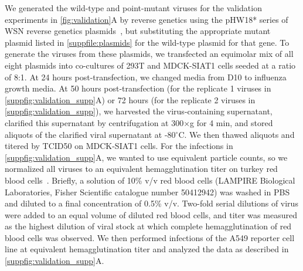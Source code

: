 \documentclass[10pt,letterpaper]{article}
\newcommand{\FIG}[1]{\autoref{fig:#1}}
\newcommand{\SUPPFILE}[1]{\autoref{suppfile:#1}}
\newcommand{\SUPPFIG}[1]{\autoref{suppfig:#1}}
\begin{document}
We generated the wild-type and point-mutant viruses for the validation experiments in \FIG{validation}A by reverse genetics using the pHW18* series of WSN reverse genetics plasmids~\citep{hoffmann2000dna}, but substituting the appropriate mutant plasmid listed in \SUPPFILE{plasmids} for the wild-type plasmid for that gene.
To generate the viruses from these plasmids, we transfected an equimolar mix of all eight plasmids into co-cultures of 293T and MDCK-SIAT1 cells seeded at a ratio of 8:1.
At 24 hours post-transfection, we changed media from D10 to influenza growth media. 
At 50 hours post-transfection (for the replicate 1 viruses in \SUPPFIG{validation_supp}A) or 72 hours (for the replicate 2 viruses in \SUPPFIG{validation_supp}), we harvested the virus-containing supernatant, clarified this supernatant by centrifugation at 300$\times$g for 4 min, and stored aliquots of the clarified viral supernatant at -80$^{\circ}$C.
We then thawed aliquots and titered by TCID50 on MDCK-SIAT1 cells.
For the infections in \SUPPFIG{validation_supp}A, we wanted to use equivalent particle counts, so we normalized all viruses to an equivalent hemagglutination titer on turkey red blood cells~\citep{hirst1942quantitative}.
 Briefly, a solution of 10\% v/v red blood cells (LAMPIRE Biological Laboratories, Fisher Scientific catalogue number 50412942)  was washed in PBS and diluted to a final concentration of 0.5\% v/v. 
Two-fold serial dilutions of virus were added to an equal volume of diluted red blood cells, and titer was measured as the highest dilution of viral stock at which complete hemagglutination of red blood cells was observed.
We then performed infections of the A549 reporter cell line at equivalent hemagglutination titer and analyzed the data as described in \SUPPFIG{validation_supp}A. 
\end{document}
